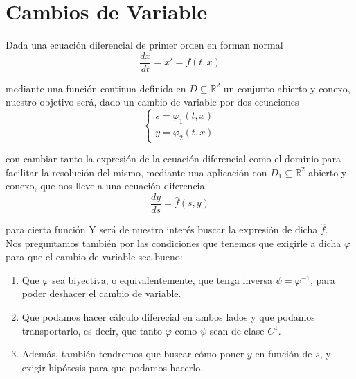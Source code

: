 \newpage
\chapter{Cambios de Variable}
Dada una ecuación diferencial de primer orden en forman normal
\begin{equation*}
    \dfrac{dx}{dt} = x' = f(t,x)
\end{equation*}

mediante una función 
continua definida en $D\subseteq \mathbb{R}^2$ un conjunto abierto y conexo, nuestro objetivo será, dado un cambio de variable por dos ecuaciones
\begin{equation*}
    \left\{\begin{array}{rl}
        s=\varphi_1(t,x) \\
        y = \varphi_2(t,x)
    \end{array}\right.
\end{equation*}

con 
cambiar tanto la expresión de la ecuación diferencial como el dominio para facilitar la resolución del mismo, mediante una aplicación
con $D_1\subseteq \mathbb{R}^2$ abierto y conexo, que nos lleve a una ecuación diferencial
\begin{equation*}
    \dfrac{dy}{ds} = \hat{f} (s,y)
\end{equation*}

para cierta función
Y será de nuestro interés buscar la expresión de dicha $\hat{f}$.\\

Nos preguntamos también por las condiciones que tenemos que exigirle a dicha $\varphi$ para que el cambio de variable sea bueno:
\begin{enumerate}
    \item Que $\varphi$ sea biyectiva, o equivalentemente, que tenga inversa $\psi = \varphi^{-1}$, para poder deshacer el cambio de variable.
    \item Que podamos hacer cálculo diferecial en ambos lados y que podamos transportarlo, es decir, que tanto $\varphi$ como $\psi$ sean de clase $C^1$.
    \item Además, también tendremos que buscar cómo poner $y$ en función de $s$, y exigir hipótesis para que podamos hacerlo.
\end{enumerate}

